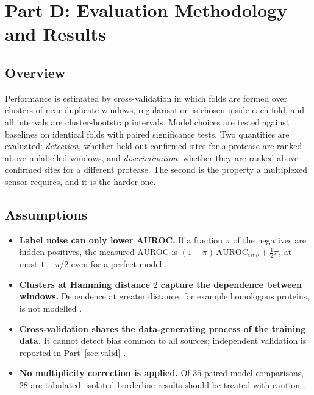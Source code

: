 \section{Part D: Evaluation Methodology and Results}
\label{sec:eval}

\subsection{Overview}

Performance is estimated by cross-validation in which folds are formed over
clusters of near-duplicate windows, regularisation is chosen inside each fold,
and all intervals are cluster-bootstrap intervals. Model choices are tested
against baselines on identical folds with paired significance tests. Two
quantities are evaluated: \emph{detection}, whether held-out confirmed sites for
a protease are ranked above unlabelled windows, and \emph{discrimination},
whether they are ranked above confirmed sites for a different protease. The
second is the property a multiplexed sensor requires, and it is the harder one.

\subsection{Assumptions}

\begin{assump}
\begin{itemize}[leftmargin=*,noitemsep]
\item \textbf{Label noise can only lower AUROC.} If a fraction $\pi$ of the
  negatives are hidden positives, the measured AUROC is
  $(1-\pi)\,\mathrm{AUROC}_{\text{true}}+\tfrac12\pi$, at most $1-\pi/2$ even for
  a perfect model \CONF.
\item \textbf{Clusters at Hamming distance $2$ capture the dependence between
  windows.} Dependence at greater distance, for example homologous proteins,
  is not modelled \FLAG.
\item \textbf{Cross-validation shares the data-generating process of the
  training data.} It cannot detect bias common to all sources; independent
  validation is reported in Part~\ref{sec:valid} \CONF.
\item \textbf{No multiplicity correction is applied.} Of $35$ paired model
  comparisons, $28$ are tabulated; isolated borderline results should be
  treated with caution \CONF.
\end{itemize}
\end{assump}


